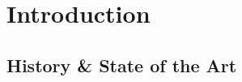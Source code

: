 \documentclass[\main/dresen_thesis.tex]{subfiles}
\begin{document}
\chapter{Introduction}\label{ch:introduction}

\section{History \& State of the Art}
\end{document}
